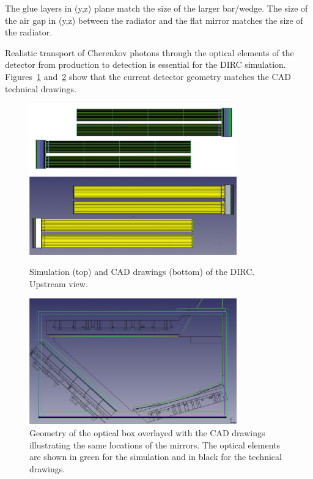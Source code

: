 The glue layers in (y,z) plane match the size of the larger bar/wedge. The size of the air gap in (y,z) between the radiator and the flat mirror matches the size of the radiator.

Realistic transport of Cherenkov photons through the optical elements of the detector from production to detection is essential for the DIRC simulation. Figures~\ref{pic:dirc} and~\ref{pic:obg} show that the current detector geometry matches the CAD technical drawings.

\begin{figure}[!h]
\centering
\includegraphics[width=0.8\textwidth]{pics/bars1.png}\\
\includegraphics[width=0.8\textwidth]{pics/bars2.png}
\caption{\label{pic:dirc}
Simulation (top) and CAD drawings (bottom) of the \gluex DIRC. Upstream view.
}
\end{figure} 

\begin{figure}[!h]
\centering
\includegraphics[width=0.8\textwidth]{pics/obgeom.png}
\caption{\label{pic:obg}
Geometry of the optical box overlayed with the CAD drawings illustrating the same locations of the mirrors. The optical elements are shown in green for the simulation and in black for the technical drawings.
}
\end{figure}

